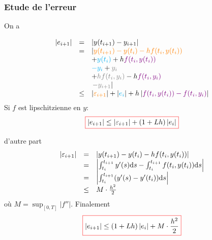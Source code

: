 \documentclass{beamer}
\def \de {{\rm d}}
\newcommand{\myredbox}[1]{\fcolorbox{red}{white}{$\displaystyle#1$}}
\begin{document}
      \begin{frame}
      \frametitle{Etude de l'erreur}
 On a     

 \[\begin{array}{ccl}
\left|e_{i+1}\right|&=&\left|y(t_{i+1})-y_{i+1}\right|\\
       &=&\left|\textcolor{orange}{ y(t_{i+1})-y(t_{i})-h f(t_i,y(t_i))}\right.\\
       &  & +\textcolor{cyan}{y(t_{i})}+h\textcolor{violet}{ f(t_i,y(t_i))} \\
       &  & \textcolor{cyan}{-y_i}+\textcolor{gray}{ y_i}\\
       &  & +\textcolor{gray}{hf(t_i,y_i)}-h\textcolor{violet}{f(t_i,y_i)}\\
       &  &\left. \textcolor{gray}{-y_{i+1} }\right|\\
       &\leq & \left|\textcolor{orange}{\varepsilon_{i+1}}\right|+\left|\textcolor{cyan}{e_{i}}\right|+h\left|\textcolor{violet}{f(t_i,y(t_i))-f(t_i,y_i)}\right|
\end{array}
\]
Si $f$ est lipschitzienne en $y$:
\[\myredbox{\left|e_{i+1}\right|\leq \left|\varepsilon_{i+1}\right|+(1+L h)\left|e_{i}\right|}\]

      \end{frame}
   
 \begin{frame}
 d'autre part
\[\begin{array}{ccl}
\left|\varepsilon_{i+1}\right|&=&\left|y(t_{i+1})-y(t_{i})-h f(t_i,y(t_i))\right|\\
&=&\left| \int_{t_i}^{t_{i+1}}y'(s)\de s- \int_{t_i}^{t_{i+1}}f(t_i,y(t_i))\de s\right|\\
&=&\left| \int_{t_i}^{t_{i+1}}(y'(s)-y'(t_i))\de s\right|\\
&\leq & M\cdot \frac{h^2}2
\end{array}
\]
où $\displaystyle M=\sup_{[0,T]}|f''|$.
Finalement
\[\myredbox{\left|e_{i+1}\right|\leq (1+L h)\left|e_{i}\right|+ M \cdot \frac{h^2}2}\]
\end{frame}   
   
\end{document}

